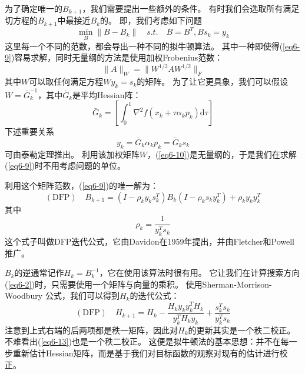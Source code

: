\documentclass{article}
\newcommand{\dif}{\mathrm{d}}
\begin{document}
为了确定唯一的$B_{k+1}$，我们需要提出一些额外的条件。
有时我们会选取所有满足切方程的$B_{k+1}$中最接近$B_k$的。
即，我们考虑如下问题
\begin{equation}
    \label{eq6-9}
    \min_{B} \|B - B_k\| \quad s.t. \quad B=B^T, Bs_k = y_k
\end{equation}
这里每一个不同的范数，都会导出一种不同的拟牛顿算法。
其中一种即使得(\ref{eq6-9})容易求解，同时无量纲的方法是使用加权Frobenius范数：
\begin{equation}
    \label{eq6-10}
    \|A\|_W = \|W^{1/2}AW^{1/2}\|_F
\end{equation}
其中$W$可以取任何满足方程$Wy_k = s_k$的矩阵。
为了让它更具象，我们可以假设$W = \bar{G}_k^{-1}$，其中$\bar{G}_k$是平均Hessian阵：
\begin{equation}
    \label{eq6-11}
    \bar{G}_k = \left[ \int_0^1 \nabla^2 f(x_k+\tau\alpha_kp_k)\dif\tau \right]
\end{equation}
下述重要关系
\begin{equation}
    \label{eq6-12}
    y_k = \bar{G}_k \alpha_k p_k = \bar{G}_k s_k
\end{equation}
可由泰勒定理推出。
利用该加权矩阵$W$，(\ref{eq6-10})是无量纲的，于是我们在求解(\ref{eq6-9})时不用考虑问题的单位。

利用这个矩阵范数，(\ref{eq6-9})的唯一解为：
\begin{equation}
    \label{eq6-13}
    (\text{DFP})\quad
    B_{k+1} = (I - \rho_ky_ks_k^T)B_k(I-\rho_ks_ky_k^T)+\rho_ky_ky_k^T
\end{equation}
其中
\begin{equation}
    \label{eq6-14}
    \rho_k = \frac1{y_k^Ts_k}
\end{equation}
这个式子叫做DFP迭代公式，它由Davidon在1959年提出，并由Fletcher和Powell推广。

$B_k$的逆通常记作$H_k = B_k^{-1}$，它在使用该算法时很有用。
它让我们在计算搜索方向(\ref{eq6-2})时，只需要使用一个矩阵与向量的乘积。
使用Sherman-Morrison-Woodbury 公式，我们可以得到$H_{k}$的迭代公式：
\begin{equation}
    \label{eq6-15}
    (\text{DFP})\quad
    H_{k+1} = H_k - \frac{H_ky_ky_k^TH_k}{y_k^TH_ky_k} + \frac{s_k^Ts_k}{y_k^Ts_k}
\end{equation}
注意到上式右端的后两项都是秩一矩阵，因此对$H_k$的更新其实是一个秩二校正。
不难看出(\ref{eq6-13})也是一个秩二校正。
这便是拟牛顿法的基本思想：并不在每一步重新估计Hessian矩阵，而是基于我们对目标函数的观察对现有的估计进行校正。
\end{document}
